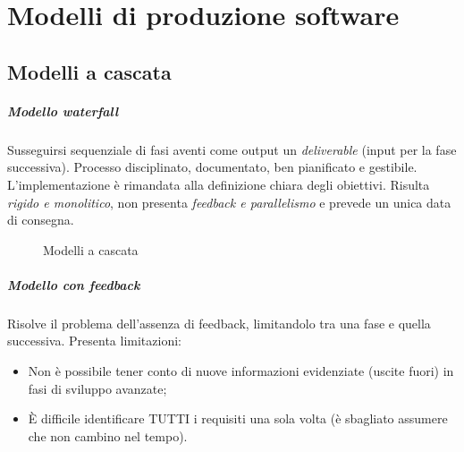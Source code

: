 \chapter{Modelli di produzione software}

\section{Modelli a cascata}

\paragraph{Modello waterfall} Susseguirsi sequenziale di fasi aventi come output un \textit{deliverable} (input per la fase successiva). Processo disciplinato, documentato, ben pianificato e gestibile. L'implementazione è rimandata alla definizione chiara degli obiettivi. Risulta \textit{rigido e monolitico}, non presenta \textit{feedback e parallelismo} e prevede un unica data di consegna.

\begin{figure}[h!]
  \centering
  \label{fig:waterfall}
  \hfill
  \label{fig:waterfall-fb}
  \caption{Modelli a cascata}
\end{figure}

\paragraph{Modello con feedback} Risolve il problema dell'assenza di feedback, limitandolo tra una fase e quella successiva. Presenta limitazioni:
\begin{itemize}
    \item Non è possibile tener conto di nuove informazioni evidenziate (uscite fuori) in fasi di sviluppo avanzate;
    \item È difficile identificare TUTTI i requisiti una sola volta (è sbagliato assumere che non cambino nel tempo).
\end{itemize}


